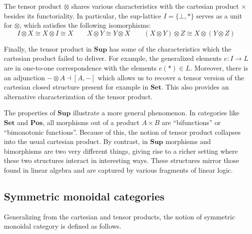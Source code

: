 \documentclass[11pt,oneside]{book}
\theoremstyle{definition}
\begin{document}
The tensor product $\otimes$ shares
various characteristics
with the cartesian product $\times$
besides its functoriality.
In particular,
the sup-lattice $I = \{ \bot, * \}$ 
serves as a unit for $\otimes$,
which satisfies the following isomorphisms:
\[
  I \otimes X \cong X \otimes I \cong X
  \qquad
  X \otimes Y \cong Y \otimes X
  \qquad
  (X \otimes Y) \otimes Z \cong X \otimes (Y \otimes Z)
\]

Finally,
the tensor product in $\mathbf{Sup}$
has some of the characteristics
which the cartesian product failed to deliver.
For example,
the generalized elements $e : I \rightarrow L$
are in one-to-one correspondence
with the elements $e(*) \in L$.
Moreover,
there is an adjunction
$- \otimes A \dashv [A, -]$
which allows us to recover a tensor version
of the cartesian closed structure
present for example in $\mathbf{Set}$.
This also provides an alternative characterization
of the tensor product.

The properties of $\mathbf{Sup}$
illustrate a more general phenomenon.
In categories like $\mathbf{Set}$ and $\mathbf{Pos}$,
all morphisms out of a product $A \times B$
are ``bifunctions'' or ``bimonotonic functions''.
Because of this,
the notion of tensor product collapses into
the usual cartesian product.
By contrast,
in $\mathbf{Sup}$ morphisms and bimorphisms
are two very different things,
giving rise to a richer setting
where these two structures
interact in interesting ways.
These structures mirror those found in linear algebra
and are captured by various fragments of linear logic.


\subsection{Symmetric monoidal categories} %

Generalizing from the cartesian and tensor products,
the notion of symmetric monoidal category
is defined as follows.
\end{document}
